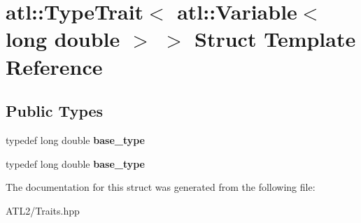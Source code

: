 \hypertarget{structatl_1_1_type_trait_3_01atl_1_1_variable_3_01long_01double_01_4_01_4}{\section{atl\+:\+:Type\+Trait$<$ atl\+:\+:Variable$<$ long double $>$ $>$ Struct Template Reference}
\label{structatl_1_1_type_trait_3_01atl_1_1_variable_3_01long_01double_01_4_01_4}
}
\subsection*{Public Types}
\begin{DoxyCompactItemize}
\item 
\hypertarget{structatl_1_1_type_trait_3_01atl_1_1_variable_3_01long_01double_01_4_01_4_ab230e756ab8433324b1391e70513bb92}{typedef long double {\bfseries base\+\_\+type}}\label{structatl_1_1_type_trait_3_01atl_1_1_variable_3_01long_01double_01_4_01_4_ab230e756ab8433324b1391e70513bb92}

\item 
\hypertarget{structatl_1_1_type_trait_3_01atl_1_1_variable_3_01long_01double_01_4_01_4_ab230e756ab8433324b1391e70513bb92}{typedef long double {\bfseries base\+\_\+type}}\label{structatl_1_1_type_trait_3_01atl_1_1_variable_3_01long_01double_01_4_01_4_ab230e756ab8433324b1391e70513bb92}

\end{DoxyCompactItemize}


The documentation for this struct was generated from the following file\+:\begin{DoxyCompactItemize}
\item 
A\+T\+L2/Traits.\+hpp\end{DoxyCompactItemize}
